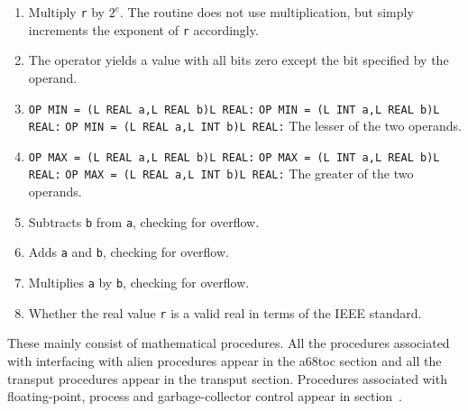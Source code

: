 \begin{enumerate}
\item {}\newline
Multiply \verb|r| by $2^e$. The routine does not use multiplication,
but simply increments the exponent of \verb|r| accordingly.
\item {}\newline
The operator yields a value with all bits zero except the bit specified
by the operand.
\item {}
\newline
\verb|OP MIN = (L REAL a,L REAL b)L REAL:| \newline
\verb|OP MIN = (L INT a,L REAL b)L REAL:| \newline
\verb|OP MIN = (L REAL a,L INT b)L REAL:| \newline
The lesser of the two operands.
\item {}
\newline
\verb|OP MAX = (L REAL a,L REAL b)L REAL:| \newline
\verb|OP MAX = (L INT a,L REAL b)L REAL:| \newline
\verb|OP MAX = (L REAL a,L INT b)L REAL:| \newline
The greater of the two operands.
\item {}\newline
Subtracts \verb|b| from \verb|a|, checking for overflow.
\item {}\newline
Adds \verb|a| and \verb|b|, checking for overflow.
\item {}\newline
Multiplies \verb|a| by \verb|b|, checking for overflow.
\item {}\newline
Whether the real value \verb|r| is a valid real in terms of the IEEE
standard.
\end{enumerate}

These mainly consist of mathematical procedures. All the procedures
associated with interfacing with alien procedures appear in the a68toc
section and all the transput procedures appear in the transput section.
Procedures associated with floating-point, process and
garbage-collector control appear in section~.

